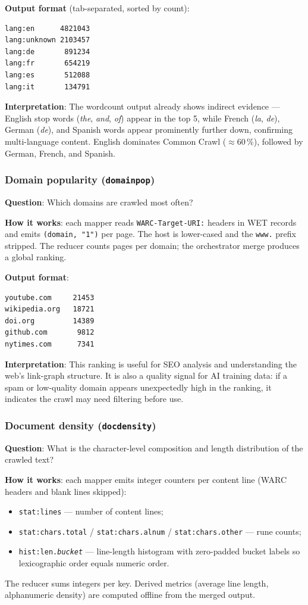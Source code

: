 \documentclass[11pt,a4paper]{article}
\begin{document}
\textbf{Output format} (tab-separated, sorted by count):
\begin{lstlisting}[style=codeblock]
lang:en      4821043
lang:unknown 2103457
lang:de       891234
lang:fr       654219
lang:es       512088
lang:it       134791
\end{lstlisting}

\textbf{Interpretation}: The wordcount output already shows indirect evidence —
English stop words (\textit{the}, \textit{and}, \textit{of}) appear in the top
5, while French (\textit{la}, \textit{de}), German (\textit{de}), and Spanish
words appear prominently further down, confirming multi-language content.
English dominates Common Crawl (\(\approx\)60\,\%), followed by German, French,
and Spanish.

\subsubsection{Domain popularity (\texttt{domainpop})}

\textbf{Question}: Which domains are crawled most often?

\textbf{How it works}: each mapper reads \texttt{WARC-Target-URI:} headers in
WET records and emits \texttt{(domain, "1")} per page. The host is
lower-cased and the \texttt{www.} prefix stripped. The reducer counts pages per
domain; the orchestrator merge produces a global ranking.

\textbf{Output format}:
\begin{lstlisting}[style=codeblock]
youtube.com     21453
wikipedia.org   18721
doi.org         14389
github.com       9812
nytimes.com      7341
\end{lstlisting}

\textbf{Interpretation}: This ranking is useful for SEO analysis and
understanding the web's link-graph structure. It is also a quality signal for
AI training data: if a spam or low-quality domain appears unexpectedly high in
the ranking, it indicates the crawl may need filtering before use.

\subsubsection{Document density (\texttt{docdensity})}

\textbf{Question}: What is the character-level composition and length
distribution of the crawled text?

\textbf{How it works}: each mapper emits integer counters per content line
(WARC headers and blank lines skipped):
\begin{itemize}[leftmargin=1.5em]
  \item \texttt{stat:lines} — number of content lines;
  \item \texttt{stat:chars.total} / \texttt{stat:chars.alnum} /
  \texttt{stat:chars.other} — rune counts;
  \item \texttt{hist:len.\textit{bucket}} — line-length histogram with
  zero-padded bucket labels so lexicographic order equals numeric order.
\end{itemize}
The reducer sums integers per key. Derived metrics (average line length,
alphanumeric density) are computed offline from the merged output.
\end{document}
